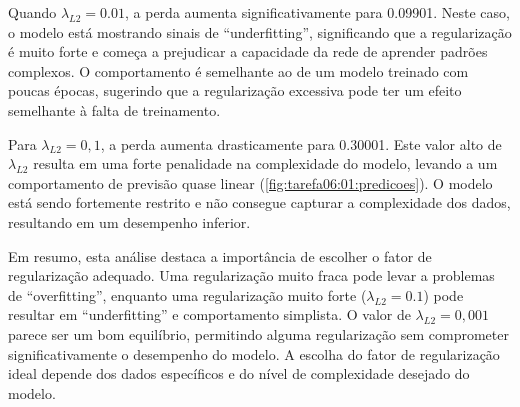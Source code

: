 Quando $\lambda_{L2}=0.01$, a perda aumenta significativamente para 0.09901. 
Neste caso, o 
modelo está mostrando sinais de ``underfitting'', significando que a 
regularização é muito forte e começa a prejudicar a capacidade da rede de 
aprender padrões complexos. O comportamento é semelhante ao de um modelo 
treinado com poucas épocas, sugerindo que a regularização excessiva pode ter um 
efeito semelhante à falta de treinamento.

Para $\lambda_{L2}=0,1$, a perda aumenta drasticamente para 0.30001. Este valor 
alto de $\lambda_{L2}$ 
resulta em uma forte penalidade na complexidade do modelo, levando a um 
comportamento de previsão quase linear (\cref{fig:tarefa06:01:predicoes}). O 
modelo está sendo fortemente restrito 
e não consegue capturar a complexidade dos dados, resultando em um desempenho 
inferior.

Em resumo, esta análise destaca a importância de escolher o fator de 
regularização adequado. Uma regularização muito fraca pode levar a 
problemas de ``overfitting'', enquanto uma regularização muito forte 
($\lambda_{L2}=0.1$) 
pode 
resultar em ``underfitting'' e comportamento simplista. O valor de 
$\lambda_{L2}=0,001$ 
parece ser um bom equilíbrio, permitindo alguma regularização sem comprometer 
significativamente o desempenho do modelo. A escolha do fator de regularização 
ideal depende dos dados específicos e do nível de complexidade desejado do 
modelo.